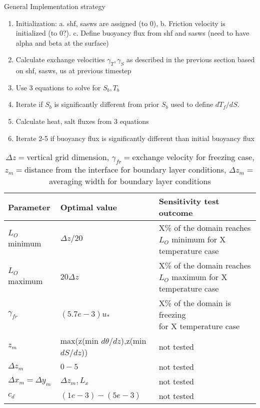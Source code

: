 \documentclass[letterpaper,10pt]{report}
\newcommand{\code}[1]{\texttt{#1}} %
\begin{document}
	
	General Implementation strategy
	\begin{enumerate}
		\item Initialization: 
		a. shf, sasws are assigned (to 0), 
		b. Friction velocity is initialized (to 0?). 
		c. Define buoyancy flux from shf and sasws 
			(need to have alpha and beta at the surface)
		\item Calculate exchange velocities $\gamma_T,\gamma_S$ as described in the previous section based on shf, sasws, us at previous timestep
		\item Use 3 equations to solve for $S_b, T_b$
		\item Iterate if $S_b$ is significantly different from prior $S_b$ used to define $dT_f/dS$.
		\item Calculate heat, salt fluxes from 3 equations
		\item Iterate 2-5 if buoyancy flux is significantly different than initial buoyancy flux
	\end{enumerate}

	\begin{table}[htbp]%
	\caption{$\Delta z = $vertical grid dimension, $\gamma_{fr} = $exchange velocity for freezing case, $z_m = $distance from the interface for boundary layer conditions, $\Delta z_m = $averaging width for boundary layer conditions}
	\label{table:most_prm}
    \centering
    \begin{tabular}{|l|l|l|}
	\hline
	Parameter & Optimal value & Sensitivity test outcome\\
	\hline
	$L_O$ minimum & $\Delta z/20$ & \makecell[l]{X\% of the domain reaches $L_O$ minimum \\ for X temperature case} \\ \hline
	$L_O$ maximum & $20\Delta z$ & \makecell[l]{X\% of the domain reaches $L_O$ maximum \\ for X temperature case}\\ \hline
    $\gamma_{fr}$ & $(5.7e-3) u_*$ & \makecell[l]{X\% of the domain is freezing \\ for X temperature case}\\ \hline
    $z_m$ & max(z(min $d\theta/dz$),z(min $dS/dz$)) & not tested\\ \hline %
    $\Delta z_m$ & $0 - 5$ & not tested\\ \hline
    $\Delta x_m = \Delta y_m$ & $\Delta z_m, L_x$ & not tested\\ \hline
	$c_d$ & $(1e-3) - (5e-3)$ & not tested\\ \hline
    \end{tabular}
	\end{table}
	
\end{document}
